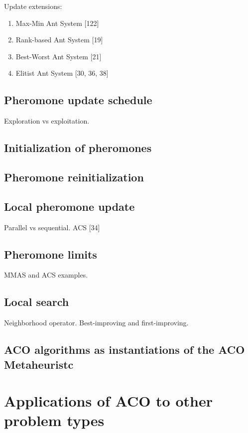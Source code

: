 \documentclass[12pt]{article}
\begin{document}
Update extensions: \\
\begin{enumerate}
\item {Max-Min Ant System [122]}
\item {Rank-based Ant System [19]}
\item {Best-Worst Ant System [21]}
\item {Elitist Ant System [30, 36, 38]}
\end{enumerate}

\subsection{Pheromone update schedule}
Exploration vs exploitation.

\subsection{Initialization of pheromones}


\subsection{Pheromone reinitialization}


\subsection{Local pheromone update}
Parallel vs sequential.
ACS [34]

\subsection{Pheromone limits}
MMAS and ACS examples.

\subsection{Local search}
Neighborhood operator.
Best-improving and first-improving.

\subsection{ACO algorithms as instantiations of the ACO Metaheuristc}

\section{Applications of ACO to other problem types}
\end{document}
